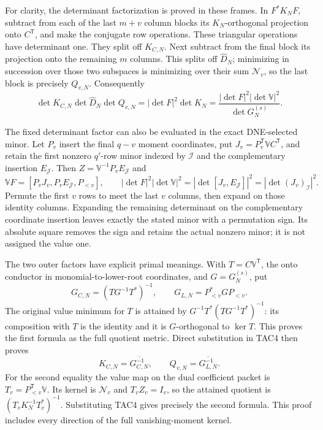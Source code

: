 For clarity, the determinant factorization is proved in these frames.
In $F^*K_NF$, subtract from each of the last $m+v$ column blocks
its $K_N$-orthogonal projection onto $C^{\mathsf T}$, and make the
conjugate row operations.  These triangular operations have determinant
one.  They split off $K_{C,N}$.  Next subtract from the final block
its projection onto the remaining $m$ columns.  This splits off
$\widehat D_N$; minimizing in succession over those two subspaces is
minimizing over their sum $\mathscr N_v$, so the last block is precisely
$Q_{v,N}$.  Consequently
\[
 \det K_{C,N}\det\widehat D_N\det Q_{v,N}
 =|\det F|^2\det K_N
 =\frac{|\det F|^2|\det\mathbb V|^2}{\det G_N^{(s)}}.
 \tag{TAC6}
\]

The fixed determinant factor can also be evaluated in the exact
DNE-selected minor. Let $P_v$ insert the final $q-v$ moment
coordinates, put $J_v=P_v^{\mathsf T}\mathbb V C^{\mathsf T}$,
and retain the first nonzero $q'$-row minor indexed by $\mathcal I$
and the complementary insertion $E_{\mathcal J}$. Then
$Z=\mathbb V^{-1}P_vE_{\mathcal J}$ and
\[
 \mathbb VF=[P_vJ_v,P_vE_{\mathcal J},P_{<v}],\qquad
 |\det F|^2|\det\mathbb V|^2
  =|\det[J_v,E_{\mathcal J}]|^2=|\det(J_v)_{\mathcal I}|^2.
 \tag{TAC6a}
\]
Permute the first $v$ rows to meet the last $v$ columns, then
expand on those identity columns. Expanding the remaining determinant
on the complementary coordinate insertion leaves exactly the stated
minor with a permutation sign. Its absolute square removes the sign
and retains the actual nonzero minor; it is not assigned the value one.

The two outer factors have explicit primal meanings. With
$T=C\mathbb V^{\mathsf T}$, the onto conductor in monomial-to-lower-root
coordinates, and $G=G_N^{(s)}$, put
\[
 G_{C,N}=(TG^{-1}T^*)^{-1},\qquad
 G_{L,N}=P_{<v}^*GP_{<v}.
\]
The original value minimum for $T$ is attained by
$G^{-1}T^*(TG^{-1}T^*)^{-1}$: its composition with $T$ is the
identity and it is $G$-orthogonal to $\ker T$. This proves the
first formula as the full quotient metric. Direct substitution in TAC4
then proves
\[
 K_{C,N}=\overline{G_{C,N}^{-1}},\qquad
 Q_{v,N}=\overline{G_{L,N}^{-1}}.
 \tag{TAC6b}
\]
For the second equality the value map on the dual coefficient packet is
$T_v=P_{<v}^{\mathsf T}\mathbb V$. Its kernel is $\mathscr N_v$
and $T_vZ_v=I_v$, so the attained quotient is
$(T_vK_N^{-1}T_v^*)^{-1}$. Substituting TAC4 gives precisely the
second formula. This proof includes every direction of the full
vanishing-moment kernel.

